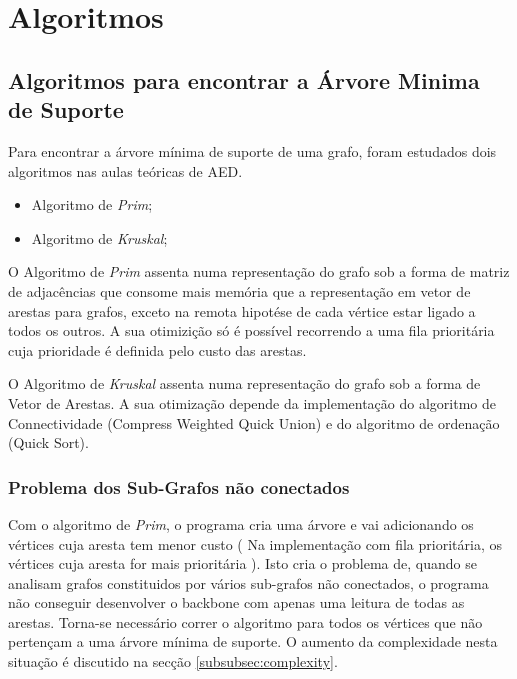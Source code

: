 \documentclass[14pt]{article}
\begin{document}
    \section[Algoritmos]{Algoritmos}\label{sec:algoritmos} 

    \subsection[Determinação de Árvore Mínima de Suporte]{Algoritmos para encontrar a Árvore Minima de Suporte}\label{subsec:mstfind} 
    Para encontrar a árvore mínima de suporte de uma grafo, foram estudados dois algoritmos nas aulas teóricas de AED.
    \begin{itemize}
        \item Algoritmo de \emph{Prim};
        \item Algoritmo de \emph{Kruskal};
    \end{itemize}

    O Algoritmo de \emph{Prim} assenta numa representação do grafo sob a forma de matriz de adjacências que consome mais memória que a
    representação em vetor de arestas para grafos, exceto na remota hipotése de cada vértice estar ligado a todos os outros.
    A sua otimizição só é possível recorrendo a uma fila prioritária cuja prioridade é definida pelo custo das arestas.

    O Algoritmo de \emph{Kruskal} assenta numa representação do grafo sob a forma de Vetor de Arestas. A sua otimização depende
    da implementação do algoritmo de Connectividade (Compress Weighted Quick Union) e do algoritmo de ordenação (Quick Sort).

    \subsubsection[Problema dos Sub-Grafos não conectados]{Problema dos Sub-Grafos não conectados}\label{subsubsec:subgraphpb}
    Com o algoritmo de \emph{Prim}, o programa cria uma árvore e vai adicionando os vértices cuja aresta tem menor custo ( Na implementação com
    fila prioritária, os vértices cuja aresta for mais prioritária ). Isto cria o problema de, quando se analisam grafos constituidos por
    vários sub-grafos não conectados, o programa não conseguir desenvolver o backbone com apenas uma leitura de todas as arestas. Torna-se
    necessário correr o algoritmo para todos os vértices que não pertençam a uma árvore mínima de suporte.
    O aumento da complexidade nesta situação é discutido na secção \ref{subsubsec:complexity}.
\end{document}
